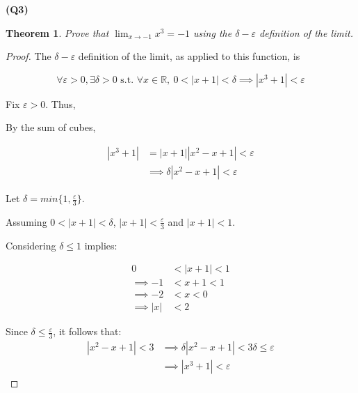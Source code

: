 \documentclass[12pt, a4paper]{article}
\renewcommand{\epsilon}{\varepsilon}
\newcommand{\R}{\mathbb{R}}
\newtheorem{theorem}{Theorem}
\begin{document}
\textbf{(Q3)}
\begin{theorem}
    Prove that $\displaystyle{\lim_{x \to -1}} x^3 = -1$ using the $\delta-\epsilon$ definition of the limit.
\end{theorem}

\begin{proof}
    The $\delta-\epsilon$ definition of the limit, as applied to this function, is

    \[
        \forall \epsilon > 0, \exists \delta > 0 \text{ s.t. } \forall x \in \R,\:
        0 < |x + 1| < \delta \implies |x^3 + 1| < \epsilon
    \]

    Fix $\epsilon > 0$. Thus,

    By the sum of cubes,

    \begin{align*}
        |x^3 + 1| & = |x + 1||x^2 - x + 1| < \epsilon\\
        & \implies \delta|x^2 - x + 1| < \epsilon
    \end{align*}

    Let $\delta = min\{1, \frac{\epsilon}{3}\}$.

    Assuming $0 < |x + 1| < \delta$, $|x + 1| < \frac{\epsilon}{3}$ and $|x + 1| < 1$.

    Considering $\delta \leq 1$ implies:

    \begin{align*}
        0 & < |x + 1| < 1\\
        \implies -1 & < x + 1 < 1\\
        \implies -2 & < x < 0\\
        \implies |x| & < 2
    \end{align*}

    Since $\delta \leq \frac{\epsilon}{3}$, it follows that:
    \begin{align*}
        |x^2 - x + 1| < 3
        & \implies \delta|x^2 - x + 1| < 3\delta \leq \epsilon\\
        & \implies |x^3 + 1| < \epsilon
    \end{align*}
\end{proof}
\end{document}
